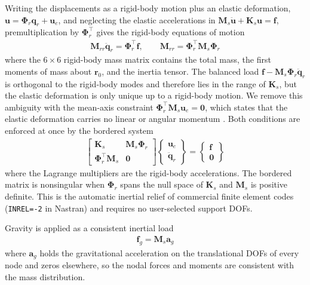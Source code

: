 \documentclass[10pt]{article}
\newcommand{\mbf}[1]{\mathbf{#1}}
\newcommand{\be}{\begin{eqnarray}}
\newcommand{\ee}{\end{eqnarray}}
\begin{document}
Writing the displacements as a rigid-body motion plus an elastic deformation, $\mbf{u} = \mbf{\Phi}_r \mbf{q}_r + \mbf{u}_e$, and neglecting the elastic accelerations in $\mbf{M}_s \ddot{\mbf{u}} + \mbf{K}_s \mbf{u} = \mbf{f}$, premultiplication by $\mbf{\Phi}_r^{\top}$ gives the rigid-body equations of motion
\be
\mbf{M}_{rr} \ddot{\mbf{q}}_r = \mbf{\Phi}_r^{\top} \mbf{f}, \qquad \mbf{M}_{rr} = \mbf{\Phi}_r^{\top} \mbf{M}_s \mbf{\Phi}_r
\ee
where the $6 \times 6$ rigid-body mass matrix contains the total mass, the first moments of mass about $\mbf{r}_0$, and the inertia tensor.
The balanced load $\mbf{f} - \mbf{M}_s \mbf{\Phi}_r \ddot{\mbf{q}}_r$ is orthogonal to the rigid-body modes and therefore lies in the range of $\mbf{K}_s$, but the elastic deformation is only unique up to a rigid-body motion.
We remove this ambiguity with the mean-axis constraint $\mbf{\Phi}_r^{\top} \mbf{M}_s \mbf{u}_e = \mbf{0}$, which states that the elastic deformation carries no linear or angular momentum \citep{Palacios2023a}.
Both conditions are enforced at once by the bordered system
\be
\label{eqn:InertialRelief}
\begin{bmatrix}
\mbf{K}_s & \mbf{M}_s \mbf{\Phi}_r \\
\mbf{\Phi}_r^{\top} \mbf{M}_s & \mbf{0}
\end{bmatrix}
\begin{Bmatrix}
\mbf{u}_e \\ \ddot{\mbf{q}}_r
\end{Bmatrix}
=
\begin{Bmatrix}
\mbf{f} \\ \mbf{0}
\end{Bmatrix}
\ee
where the Lagrange multipliers are the rigid-body accelerations.
The bordered matrix is nonsingular when $\mbf{\Phi}_r$ spans the null space of $\mbf{K}_s$ and $\mbf{M}_s$ is positive definite.
This is the automatic inertial relief of commercial finite element codes (\texttt{INREL=-2} in Nastran) and requires no user-selected support DOFs.

Gravity is applied as a consistent inertial load
\be
\mbf{f}_g = \mbf{M}_s \mbf{a}_g
\ee
where $\mbf{a}_g$ holds the gravitational acceleration on the translational DOFs of every node and zeros elsewhere, so the nodal forces and moments are consistent with the mass distribution.
\end{document}
